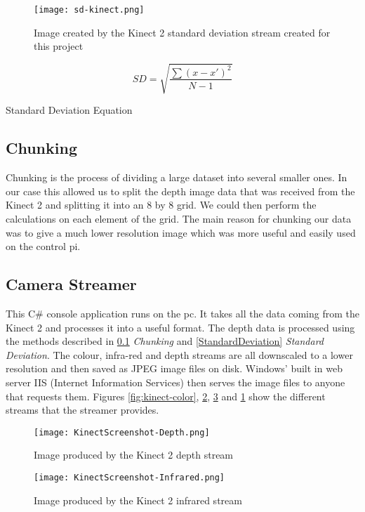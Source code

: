 \begin{figure}[!htb]
\begin{center}
\texttt{[image: sd-kinect.png]}
\end{center}
\caption{Image created by the Kinect 2 standard deviation stream created for this project}
\label{fig:sd-kinect}
\end{figure}

\begin{capequ}[!htb]
\begin{center}
\begin{equation}
\textit{SD} = \sqrt{\frac{\sum (x - x')^2}{N - 1}}
\end{equation}
\caption{Standard Deviation Equation}
\label{SDEquation}
\end{center}
\end{capequ}

\subsection{Chunking}\label{Chunking}
Chunking is the process of dividing a large dataset into several smaller ones. In our case this allowed us to split the depth image data that was received from the Kinect 2 and splitting it into an 8 by 8 grid. We could then perform the calculations on each element of the grid. The main reason for chunking our data was to give a much lower resolution image which was more useful and easily used on the control pi.

\subsection{Camera Streamer}
This C\# console application runs on the pc. It takes all the data coming from the Kinect 2 and processes it into a useful format.
The depth data is processed using the methods described in \ref{Chunking} \textit{Chunking} and \ref{StandardDeviation} \textit{Standard Deviation}. The colour, infra-red and depth streams are all downscaled to a lower resolution and then saved as JPEG image files on disk. Windows' built in web server IIS (Internet Information Services) then serves the image files to anyone that requests them. Figures \ref{fig:kinect-color}, \ref{fig:kinect-depth}, \ref{fig:kinect-ir} and \ref{fig:sd-kinect} show the different streams that the streamer provides.


\begin{figure}[!htb]
\begin{center}
\texttt{[image: KinectScreenshot-Depth.png]}
\end{center}
\caption{Image produced by the Kinect 2 depth stream}
\label{fig:kinect-depth}
\end{figure}

\begin{figure}[!htb]
\begin{center}
\texttt{[image: KinectScreenshot-Infrared.png]}
\end{center}
\caption{Image produced by the Kinect 2 infrared stream}
\label{fig:kinect-ir}
\end{figure}

\pagestyle{euanstuart}













